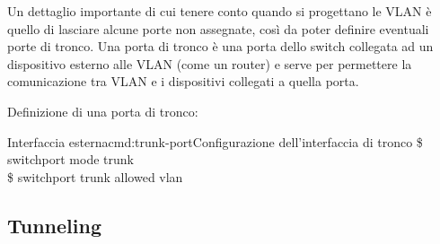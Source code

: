 Un dettaglio importante di cui tenere conto quando si progettano le VLAN è quello di lasciare alcune porte non assegnate, così da poter definire eventuali porte di tronco. Una porta di tronco è una porta dello switch collegata ad un dispositivo esterno alle VLAN (come un router) e serve per permettere la comunicazione tra VLAN e i dispositivi collegati a quella porta.

Definizione di una porta di tronco:

\begin{cmds}[Switch]{Interfaccia esterna}{cmd:trunk-port}{Configurazione dell'interfaccia di tronco}
    \$ switchport mode trunk\\
    \$ switchport trunk allowed vlan
\end{cmds}

\subsection{Tunneling}
